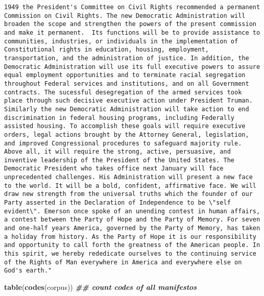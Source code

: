 \documentclass[
]{article}
\newenvironment{Shaded}{\begin{snugshade}}{\end{snugshade}}
\newcommand{\DocumentationTok}[1]{\textcolor[rgb]{0.56,0.35,0.01}{\textbf{\textit{#1}}}}
\newcommand{\FunctionTok}[1]{\textcolor[rgb]{0.13,0.29,0.53}{\textbf{#1}}}
\newcommand{\NormalTok}[1]{#1}
\begin{document}
\begin{verbatim}
1949 the President's Committee on Civil Rights recommended a permanent Commission on Civil Rights. The new Democratic Administration will broaden the scope and strengthen the powers of the present commission and make it permanent.  Its functions will be to provide assistance to communities, industries, or individuals in the implementation of Constitutional rights in education, housing, employment, transportation, and the administration of justice. In addition, the Democratic Administration will use its full executive powers to assure equal employment opportunities and to terminate racial segregation throughout Federal services and institutions, and on all Government contracts. The sucessful desegregation of the armed services took place through such decisive executive action under President Truman. Similarly the new Democratic Administration will take action to end discrimination in federal housing programs, including Federally assisted housing. To accomplish these goals will require executive orders, legal actions brought by the Attorney General, legislation, and improved Congressional procedures to safeguard majority rule. Above all, it will require the strong, active, persuasive, and inventive leadership of the President of the United States. The Democratic President who takes office next January will face unprecedented challenges. His Administration will present a new face to the world. It will be a bold, confident, affirmative face. We will draw new strength from the universal truths which the founder of our Party asserted in the Declaration of Independence to be \"self evident\". Emerson once spoke of an unending contest in human affairs, a contest between the Party of Hope and the Party of Memory. For seven and one-half years America, governed by the Party of Memory, has taken a holiday from history. As the Party of Hope it is our responsibility and opportunity to call forth the greatness of the American people. In this spirit, we hereby rededicate ourselves to the continuing service of the Rights of Man everywhere in America and everywhere else on God's earth."
\end{verbatim}

\begin{Shaded}
\begin{Highlighting}[]
\FunctionTok{table}\NormalTok{(}\FunctionTok{codes}\NormalTok{(corpus)) }\DocumentationTok{\#\# count codes of all manifestos}
\end{Highlighting}
\end{Shaded}
\end{document}
